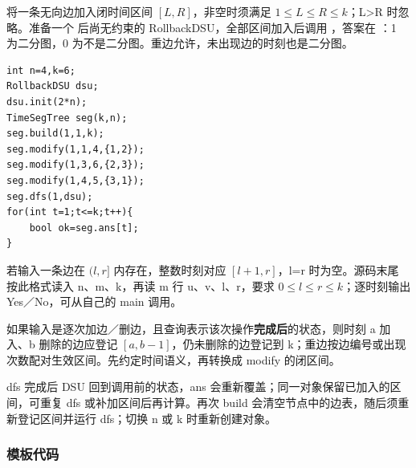  将一条无向边加入闭时间区间 $[L,R]$，非空时须满足 $1\le L\le R\le k$；L>R 时忽略。准备一个  后尚无约束的 RollbackDSU，全部区间加入后调用 ，答案在 ：1 为二分图，0 为不是二分图。重边允许，未出现边的时刻也是二分图。
\begin{lstlisting}[style=mtycpp,numbers=none]
int n=4,k=6;
RollbackDSU dsu;
dsu.init(2*n);
TimeSegTree seg(k,n);
seg.build(1,1,k);
seg.modify(1,1,4,{1,2});
seg.modify(1,3,6,{2,3});
seg.modify(1,4,5,{3,1});
seg.dfs(1,dsu);
for(int t=1;t<=k;t++){
	bool ok=seg.ans[t];
}
\end{lstlisting}

若输入一条边在 $(l,r]$ 内存在，整数时刻对应 $[l+1,r]$，l=r 时为空。源码末尾  按此格式读入 n、m、k，再读 m 行 u、v、l、r，要求 $0\le l\le r\le k$；逐时刻输出 Yes／No，可从自己的 main 调用。

如果输入是逐次加边／删边，且查询表示该次操作\textbf{完成后}的状态，则时刻 a 加入、b 删除的边应登记 $[a,b-1]$，仍未删除的边登记到 k；重边按边编号或出现次数配对生效区间。先约定时间语义，再转换成 modify 的闭区间。

dfs 完成后 DSU 回到调用前的状态，ans 会重新覆盖；同一对象保留已加入的区间，可重复 dfs 或补加区间后再计算。再次 build 会清空节点中的边表，随后须重新登记区间并运行 dfs；切换 n 或 k 时重新创建对象。
\subsubsection*{模板代码}
